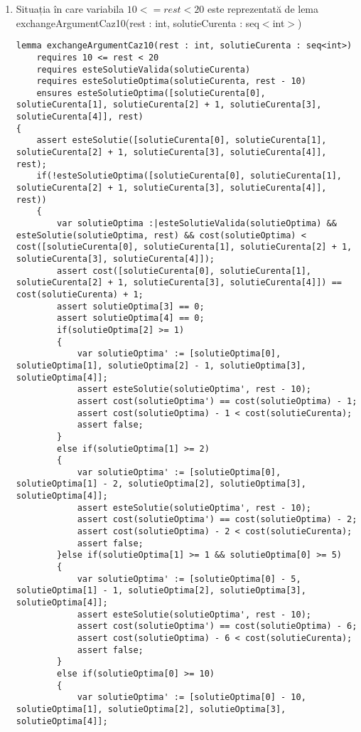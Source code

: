 \begin{enumerate}
\item Situația în care variabila $10 <= rest <20$ este reprezentată de lema exchangeArgumentCaz10(rest : int, solutieCurenta : seq$<$int$>$)
\par 
	
\begin{lstlisting}
lemma exchangeArgumentCaz10(rest : int, solutieCurenta : seq<int>)
	requires 10 <= rest < 20
	requires esteSolutieValida(solutieCurenta)
	requires esteSolutieOptima(solutieCurenta, rest - 10)
	ensures esteSolutieOptima([solutieCurenta[0], solutieCurenta[1], solutieCurenta[2] + 1, solutieCurenta[3], solutieCurenta[4]], rest)
{
	assert esteSolutie([solutieCurenta[0], solutieCurenta[1], solutieCurenta[2] + 1, solutieCurenta[3], solutieCurenta[4]], rest);
	if(!esteSolutieOptima([solutieCurenta[0], solutieCurenta[1], solutieCurenta[2] + 1, solutieCurenta[3], solutieCurenta[4]], rest))
	{
		var solutieOptima :|esteSolutieValida(solutieOptima) && esteSolutie(solutieOptima, rest) && cost(solutieOptima) < cost([solutieCurenta[0], solutieCurenta[1], solutieCurenta[2] + 1, solutieCurenta[3], solutieCurenta[4]]);
		assert cost([solutieCurenta[0], solutieCurenta[1], solutieCurenta[2] + 1, solutieCurenta[3], solutieCurenta[4]]) == cost(solutieCurenta) + 1;
		assert solutieOptima[3] == 0;
		assert solutieOptima[4] == 0;
		if(solutieOptima[2] >= 1)
		{
			var solutieOptima' := [solutieOptima[0], solutieOptima[1], solutieOptima[2] - 1, solutieOptima[3], solutieOptima[4]];
			assert esteSolutie(solutieOptima', rest - 10);
			assert cost(solutieOptima') == cost(solutieOptima) - 1;
			assert cost(solutieOptima) - 1 < cost(solutieCurenta);
			assert false;
		}
		else if(solutieOptima[1] >= 2)
		{
			var solutieOptima' := [solutieOptima[0], solutieOptima[1] - 2, solutieOptima[2], solutieOptima[3], solutieOptima[4]];
			assert esteSolutie(solutieOptima', rest - 10);
			assert cost(solutieOptima') == cost(solutieOptima) - 2;
			assert cost(solutieOptima) - 2 < cost(solutieCurenta);
			assert false;
		}else if(solutieOptima[1] >= 1 && solutieOptima[0] >= 5)
		{
			var solutieOptima' := [solutieOptima[0] - 5, solutieOptima[1] - 1, solutieOptima[2], solutieOptima[3], solutieOptima[4]];
			assert esteSolutie(solutieOptima', rest - 10);
			assert cost(solutieOptima') == cost(solutieOptima) - 6;
			assert cost(solutieOptima) - 6 < cost(solutieCurenta);
			assert false;
		}
		else if(solutieOptima[0] >= 10)
		{
			var solutieOptima' := [solutieOptima[0] - 10, solutieOptima[1], solutieOptima[2], solutieOptima[3], solutieOptima[4]];

\end{lstlisting}
\end{enumerate}
